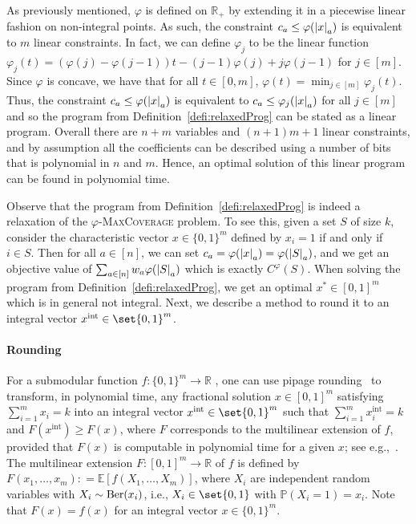 As previously mentioned, $\varphi$ is defined on $\mathbb{R}_+$ by extending it in a piecewise linear fashion on non-integral points. As such, the constraint $c_a \leq \varphi(\abs{x}_a)$ is equivalent to $m$ linear constraints. In fact, we can define $\varphi_j$ to be the linear function $\varphi_j(t) = (\varphi(j) - \varphi(j-1)) t  - (j-1) \varphi(j) + j \varphi(j-1)$ for $j \in [m]$. Since $\varphi$ is concave, we have that for all $t \in [0, m]$, $\varphi(t) = \min_{j \in [m]} \varphi_j(t)$. Thus, the constraint $c_a \leq \varphi(\abs{x}_a)$ is equivalent to $c_a \leq \varphi_j(\abs{x}_a)$ for all $j\in [m]$ and so the program from Definition~\ref{defi:relaxedProg} can be stated as a linear program. Overall there are $n+m$ variables and $(n+1)m + 1$ linear constraints, and by assumption all the coefficients can be described using a number of bits that is polynomial in $n$ and $m$. Hence, an optimal solution of this linear program can be found in polynomial time.

Observe that the program from Definition~\ref{defi:relaxedProg} is indeed a relaxation of the $\varphi$-\textsc{MaxCoverage} problem. To see this, given a set $S$ of size $k$, consider the characteristic vector $x \in \{0,1\}^m$ defined by $x_i = 1$ if and only if $i \in S$. Then for all $a \in [n]$, we can set $c_a = \varphi(\abs{x}_a) = \varphi(\abs{S}_a)$, and we get an objective value of $\sum_{a \in [n]}w_a\varphi(\abs{S}_a)$ which is exactly $C^{\varphi}(S)$. When solving the program from Definition~\ref{defi:relaxedProg}, we get an optimal $x^* \in [0,1]^m$ which is in general not integral. Next, we describe a method to round it to an integral vector $x^{\text{int}} \in \set{0,1}^m$.

\paragraph{Rounding} 
For a submodular function $f : \{0,1\}^m \to \mathbb{R}$ , one can use pipage rounding~\cite{AS04, Vondrak07, CCPV11} to transform, in polynomial time, any fractional solution $x \in [0,1]^m$ satisfying $\sum_{i=1}^m x_i = k$ into an integral vector $x^{\text{int}} \in \set{0,1}^m$ such that $\sum_{i=1}^m x^{\text{int}}_i = k$ and $F(x^{\text{int}}) \geq F(x)$, where $F$ corresponds to the multilinear extension of $f$, provided that $F(x)$ is computable in polynomial time for a given $x$; see e.g.,~\cite[Lemma 3.4]{Vondrak07}. The multilinear extension $F : [0, 1]^m \rightarrow \mathbb{R}$ of $f$ is defined by $F(x_1,\ldots,x_m): = \mathbb{E}[f(X_1,\ldots,X_m)]$, where $X_i$ are independent random variables with $X_i \sim \operatorname{\text{Ber}}(x_i)$, i.e., $X_i \in \set{0,1}$ with $\mathbb{P}(X_i = 1) = x_i$. Note that $F(x) = f(x)$ for an integral vector $x \in \{0,1\}^m$.

